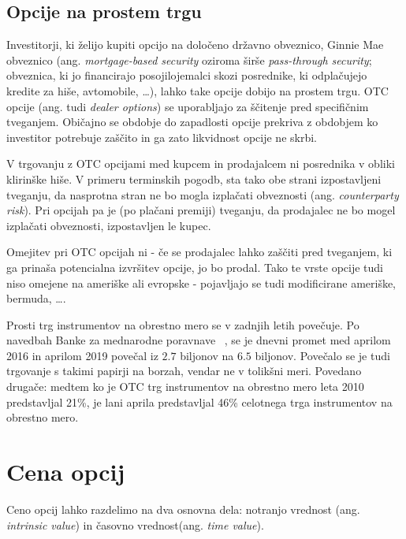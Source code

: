 \documentclass[a4paper]{article}
\begin{document}
\subsection{Opcije na prostem trgu}
Investitorji, ki želijo kupiti opcijo na določeno državno obveznico, Ginnie Mae obveznico (ang. \textit{mortgage-based security} oziroma širše \textit{pass-through security};
obveznica, ki jo financirajo posojilojemalci skozi posrednike, ki odplačujejo kredite za hiše, avtomobile, \ldots), lahko take opcije dobijo na prostem trgu.
OTC opcije (ang. tudi \textit{dealer options}) se uporabljajo za ščitenje pred specifičnim tveganjem. Običajno se obdobje do zapadlosti opcije prekriva z obdobjem 
ko investitor potrebuje zaščito in ga zato likvidnost opcije ne skrbi.

V trgovanju z OTC opcijami med kupcem in prodajalcem ni posrednika v obliki klirinške hiše. V primeru terminskih pogodb, sta tako
obe strani izpostavljeni tveganju, da nasprotna stran ne bo mogla izplačati obveznosti (ang. \textit{counterparty risk}). Pri opcijah
pa je (po plačani premiji) tveganju, da prodajalec ne bo mogel izplačati obveznosti, izpostavljen le kupec.

Omejitev pri OTC opcijah ni - če se prodajalec lahko zaščiti pred tveganjem, ki ga prinaša potencialna izvršitev opcije, jo bo prodal.
Tako te vrste opcije tudi niso omejene na ameriške ali evropske - pojavljajo se tudi modificirane ameriške, bermuda, \ldots.

Prosti trg instrumentov na obrestno mero se v zadnjih letih povečuje. Po navedbah Banke za mednarodne poravnave ~\cite{bis}, se je dnevni promet
med aprilom 2016 in aprilom 2019 povečal iz \textdollar$2.7$ biljonov na \textdollar$6.5$ biljonov. Povečalo se je tudi trgovanje s takimi papirji na borzah, 
vendar ne v tolikšni meri. Povedano drugače: medtem ko je OTC trg instrumentov na obrestno mero leta 2010 predstavljal 21\%, je lani aprila predstavljal
46\% celotnega trga instrumentov na obrestno mero. 

\section{Cena opcij} \label{cenaopcij}
Ceno opcij lahko razdelimo na dva osnovna dela: notranjo vrednost (ang. \textit{intrinsic value}) in časovno vrednost(ang. \textit{time value}).
\end{document}
